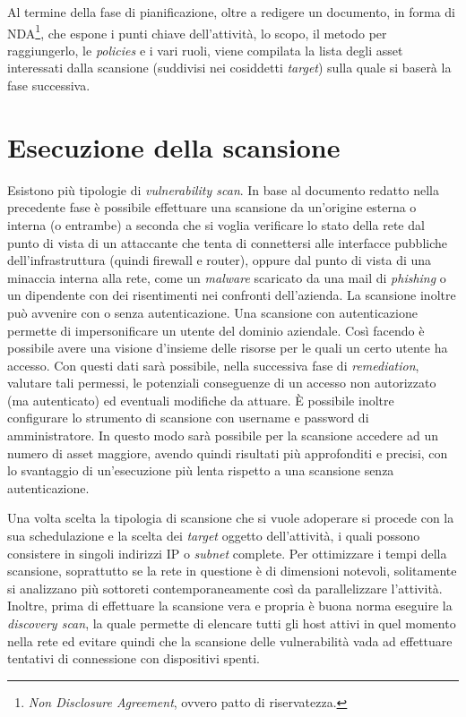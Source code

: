 \documentclass[target=bach,aauheader=]{thud}
\begin{document}
Al termine della fase di pianificazione, oltre a redigere un documento, in forma di NDA\footnote{\textit{Non Disclosure Agreement}, ovvero patto di riservatezza.}, che espone i punti chiave dell’attività, lo scopo, il metodo per raggiungerlo, le \textit{policies} e i vari ruoli, viene compilata la lista degli asset interessati dalla scansione (suddivisi nei cosiddetti \textit{target}) sulla quale si baserà la fase successiva.


\section{Esecuzione della scansione}
Esistono più tipologie di \textit{vulnerability scan}. In base al documento redatto nella precedente fase è possibile effettuare una scansione da un’origine esterna o interna (o entrambe) a seconda che si voglia verificare lo stato della rete dal punto di vista di un attaccante che tenta di connettersi alle interfacce pubbliche dell’infrastruttura (quindi firewall e router), oppure dal punto di vista di una minaccia interna alla rete, come un \textit{malware} scaricato da una mail di \textit{phishing} o un dipendente con dei risentimenti nei confronti dell’azienda. La scansione inoltre può avvenire con o senza autenticazione. Una scansione con autenticazione permette di impersonificare un utente del dominio aziendale. Così facendo è possibile avere una visione d’insieme delle risorse per le quali un certo utente ha accesso. Con questi dati sarà possibile, nella successiva fase di \textit{remediation}, valutare tali permessi, le potenziali conseguenze di un accesso non autorizzato (ma autenticato) ed eventuali modifiche da attuare. È possibile inoltre configurare lo strumento di scansione con username e password di amministratore. In questo modo sarà possibile per la scansione accedere ad un numero di asset maggiore, avendo quindi risultati più approfonditi e precisi, con lo svantaggio di un’esecuzione più lenta rispetto a una scansione senza autenticazione.

Una volta scelta la tipologia di scansione che si vuole adoperare si procede con la sua schedulazione e la scelta dei \textit{target} oggetto dell’attività, i quali possono consistere in singoli indirizzi IP o \textit{subnet} complete. Per ottimizzare i tempi della scansione, soprattutto se la rete in questione è di dimensioni notevoli, solitamente si analizzano più sottoreti contemporaneamente così da parallelizzare l’attività. Inoltre, prima di effettuare la scansione vera e propria è buona norma eseguire la \textit{discovery scan}, la quale permette di elencare tutti gli host attivi in quel momento nella rete ed evitare quindi che la scansione delle vulnerabilità vada ad effettuare tentativi di connessione con dispositivi spenti.
\end{document}
